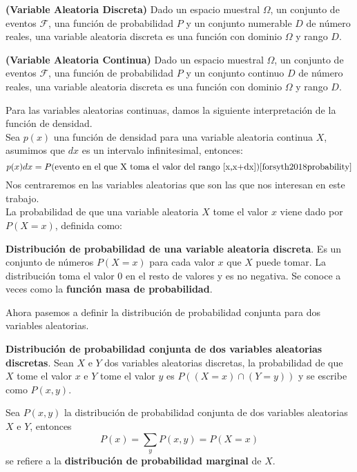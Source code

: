 \begin{definicion}
\textbf{(Variable Aleatoria Discreta) } Dado un espacio muestral $\Omega$, un conjunto de eventos $\mathcal{F}$, una función de probabilidad $P$ y un conjunto numerable $D$ de número reales, una variable aleatoria discreta es una función con dominio $\Omega$ y rango $D$.
\end{definicion}
\begin{definicion}
\textbf{(Variable Aleatoria Continua) } Dado un espacio muestral $\Omega$, un conjunto de eventos $\mathcal{F}$, una función de probabilidad $P$ y un conjunto continuo $D$ de número reales, una variable aleatoria discreta es una función con dominio $\Omega$ y rango $D$.
\end{definicion}
Para las variables aleatorias continuas, damos la siguiente interpretación  de la función de densidad.\\
Sea $p(x)$ una función de densidad para una variable aleatoria continua $X$, asumimos que $dx$ es un intervalo infinitesimal, entonces:
\[ p(x)dx=P(\textnormal{evento en el que X toma el valor del rango [x,x+dx]}) \cite{forsyth2018probability} \]
Nos centraremos en las variables aleatorias que son las que nos interesan en este trabajo.\\
La probabilidad de que una variable aleatoria $X$ tome el valor $x$ viene dado por $P(X=x)$, definida como:
\begin{definicion}
\textbf{Distribución de probabilidad de una variable aleatoria discreta}. Es un conjunto de números $P(X=x)$ para cada valor $x$ que $X$ puede tomar. La distribución toma el valor $0$ en el resto de valores y es no negativa. Se conoce a veces como la \textbf{función masa de probabilidad}.
\end{definicion}
Ahora pasemos a definir la distribución de probabilidad conjunta para dos variables aleatorias.
\begin{definicion}
\textbf{Distribución de probabilidad conjunta de dos variables aleatorias discretas}. Sean $X$ e $Y$ dos variables aleatorias discretas, la probabilidad de que $X$ tome el valor $x$ e $Y$ tome el valor $y$ es $P((X=x) \cap (Y=y))$ y se escribe como $P(x,y)$.
\end{definicion}
\begin{definicion}
Sea $P(x,y)$ la distribución de probabilidad conjunta de dos variables aleatorias $X$ e $Y$, entonces 
\[ P(x)=\sum_{y}P(x,y)=P(X=x) \]
se refiere a la \textbf{distribución de probabilidad marginal} de $X$.
\end{definicion}
